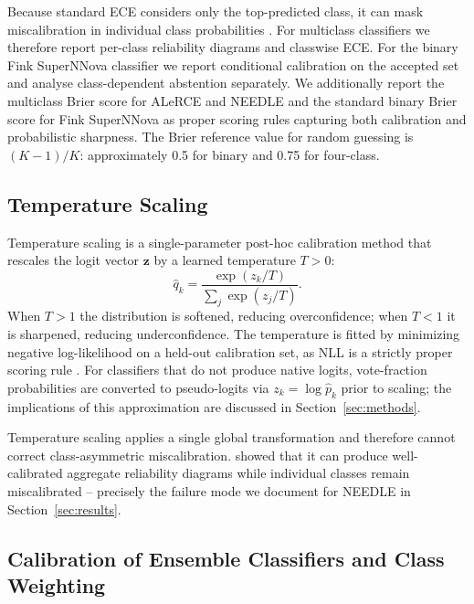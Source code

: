 \documentclass[twocolumn]{aastex631}
\begin{document}
Because standard ECE considers only the top-predicted class, it
can mask miscalibration in individual class probabilities
\citep{nixon2019}. For multiclass classifiers we therefore report
per-class reliability diagrams and classwise ECE. For the binary
Fink SuperNNova classifier we report conditional calibration on
the accepted set and analyse class-dependent abstention separately.
We additionally report the multiclass Brier score \citep{brier1950}
for ALeRCE and NEEDLE and the standard binary Brier score for
Fink SuperNNova as proper scoring rules capturing both calibration
and probabilistic sharpness. The Brier reference value for random
guessing is $(K-1)/K$: approximately 0.5 for binary and 0.75
for four-class.

\subsection{Temperature Scaling}\label{sec:tempscaling}

Temperature scaling \citep{guo2017} is a single-parameter post-hoc
calibration method that rescales the logit vector $\mathbf{z}$ by
a learned temperature $T > 0$:
\begin{equation}
    \hat{q}_k = \frac{\exp(z_k/T)}{\sum_j \exp(z_j/T)}.
    \label{eq:tempscaling}
\end{equation}
When $T > 1$ the distribution is softened, reducing overconfidence;
when $T < 1$ it is sharpened, reducing underconfidence. The
temperature is fitted by minimizing negative log-likelihood on a
held-out calibration set, as NLL is a strictly proper scoring rule
\citep{gneiting2007}. For classifiers that do not produce native
logits, vote-fraction probabilities are converted to pseudo-logits
via $z_k = \log \hat{p}_k$ prior to scaling; the implications of
this approximation are discussed in Section~\ref{sec:methods}.

Temperature scaling applies a single global transformation and
therefore cannot correct class-asymmetric miscalibration.
\citet{kull2019} showed that it can produce well-calibrated
aggregate reliability diagrams while individual classes remain
miscalibrated -- precisely the failure mode we document for NEEDLE
in Section~\ref{sec:results}.

\subsection{Calibration of Ensemble Classifiers and Class
Weighting}\label{sec:rfcalib}
\end{document}
